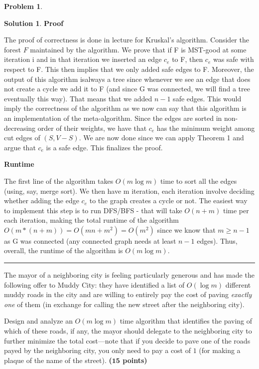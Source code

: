 \documentclass{article}
\theoremstyle{definition}
\newtheorem{problem}{Problem}
\def\fline{\rule{0.75\linewidth}{0.5pt}}
\newcommand{\finishline}{\begin{center}\fline\end{center}}
\newtheorem*{solution*}{Solution}
\newenvironment{solution}{\begin{solution*}}{{\finishline} \end{solution*}}
\newcommand{\grade}[1]{\hfill{\textbf{($\mathbf{#1}$ points)}}}
\begin{document}
\begin{problem}
\begin{enumerate}
\begin{solution}
\item\textbf{Proof}
\item The proof of correctness is done in lecture for Kruskal's algorithm. Consider the forest $F$ maintained by the algorithm.  We prove that if F is MST-good at some iteration i and in that iteration we inserted an edge $c_e$ to F, then $c_e$ was safe with respect to F.   This  then  implies  that  we  only  added  safe  edges to F. Moreover,  the  output  of  this  algorithm  isalways a tree since whenever we see an edge that does not create a cycle we add it to F (and since G was connected, we will find a tree eventually this way).  That means that we added $n-1$ safe edges.  This would imply the correctness of the algorithm as we now can say that this algorithm is an implementation of the meta-algorithm. Since the edges are sorted in non-decreasing order of their weights, we have that $c_e$ has the minimum weight among cut edges of $(S,V-S)$. We are now done since we can apply Theorem 1 and argue that $c_e$ is a safe edge.  This finalizes the proof.

\item \textbf{Runtime}
\item The first line of the algorithm takes $O(m\log m)$ time to sort all the edges (using, say, merge sort).  We then have m iteration, each iteration involve deciding whether adding the edge $c_e$ to the graph creates a cycle or not.  The easiest way to implement this step is to run DFS/BFS - that will take $O(n+m)$ time per each iteration, making the total runtime of the algorithm $O(m*(n+m)) = O(mn+m^2) = O(m^2)$ since we know that $m \geq n-1$ as G was connected (any connected graph needs at least $n-1$ edges). Thus, overall, the runtime of the algorithm is $O(m\log m)$.
\end{solution}

		\item [(b)] The mayor of a neighboring city is feeling particularly generous and has made the following offer to Muddy City: they have identified a list of $O(\log{m})$ different muddy roads in the city and are willing to entirely pay
		 the cost of paving \emph{exactly one} of them (in exchange for calling the new street after the neighboring city). 
		 
		 Design and analyze an $O(m\log{m})$ time algorithm that identifies the paving of which of these roads, if any, the mayor should delegate to the neighboring city 
		 to further minimize the total cost---note that if you  decide to pave one of the roads payed by the neighboring city, you only need to pay a cost of $1$ (for making a plaque of the name of the street). \grade{15}
		 

\end{enumerate}
\end{problem}
\end{document}
